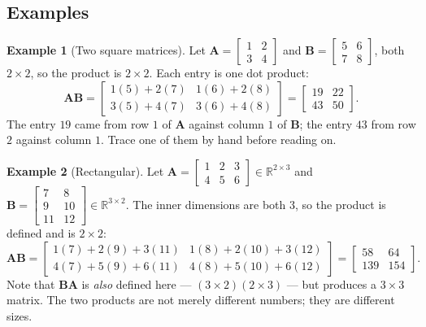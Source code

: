 \documentclass[11pt]{article}
\theoremstyle{plain}
\theoremstyle{definition}
\newtheorem{ex}{Example}[section]
\theoremstyle{remark}
\newcommand{\R}{\mathbb{R}}
\newcommand{\mt}[1]{\mathbf{#1}}        %
\begin{document}
\subsection{Examples}
\begin{ex}[Two square matrices]
Let $\mt{A}=\begin{bmatrix}1&2\\3&4\end{bmatrix}$ and
$\mt{B}=\begin{bmatrix}5&6\\7&8\end{bmatrix}$, both $2\times2$, so the product
is $2\times2$. Each entry is one dot product:
\[
  \mt{A}\mt{B}=
  \begin{bmatrix}
    1(5)+2(7) & 1(6)+2(8)\\[2pt]
    3(5)+4(7) & 3(6)+4(8)
  \end{bmatrix}
  =\begin{bmatrix}19&22\\43&50\end{bmatrix} .
\]
The entry $19$ came from row $1$ of $\mt{A}$ against column $1$ of $\mt{B}$; the
entry $43$ from row $2$ against column $1$. Trace one of them by hand before
reading on.
\end{ex}

\begin{ex}[Rectangular]
Let $\mt{A}=\begin{bmatrix}1&2&3\\4&5&6\end{bmatrix}\in\R^{2\times3}$ and
$\mt{B}=\begin{bmatrix}7&8\\9&10\\11&12\end{bmatrix}\in\R^{3\times2}$. The inner
dimensions are both $3$, so the product is defined and is $2\times2$:
\[
  \mt{A}\mt{B}=
  \begin{bmatrix}
    1(7)+2(9)+3(11) & 1(8)+2(10)+3(12)\\[2pt]
    4(7)+5(9)+6(11) & 4(8)+5(10)+6(12)
  \end{bmatrix}
  =\begin{bmatrix}58&64\\139&154\end{bmatrix} .
\]
Note that $\mt{B}\mt{A}$ is \emph{also} defined here --- $(3\times2)(2\times3)$
--- but produces a $3\times3$ matrix. The two products are not merely different
numbers; they are different sizes.
\end{ex}
\end{document}
